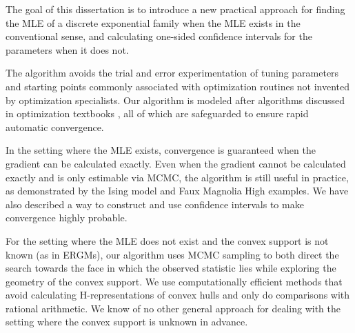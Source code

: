 The goal of this dissertation is to introduce a new practical approach
for finding the MLE of a discrete exponential family when the MLE exists
in the conventional sense,
and calculating one-sided confidence intervals for the parameters when it does not.

The algorithm avoids the trial and error experimentation of tuning parameters 
and starting points commonly associated with optimization routines
not invented by optimization specialists.  Our algorithm is modeled after algorithms 
discussed in optimization textbooks \citep{Fletcher,NW,Sun:2006},
all of which are safeguarded to ensure rapid automatic convergence.

In the setting where the MLE exists, convergence is guaranteed when the gradient 
can be calculated exactly.  Even when the 
gradient cannot be calculated 
exactly and is only estimable via MCMC, the algorithm is still useful in practice, as 
demonstrated by the Ising model and Faux Magnolia High
examples.  We have also described a way to construct and use confidence intervals to 
make convergence highly probable.

For the setting where the MLE does not exist and the convex support is 
not known (as in ERGMs), our algorithm uses MCMC sampling to
both direct the search towards the face in which the observed statistic lies
while exploring the geometry of the convex support.  We use
computationally efficient methods that avoid calculating H-representations
of convex hulls and only do comparisons with rational arithmetic.
We know of no other general approach for dealing with the setting where
the convex support is unknown in advance.

